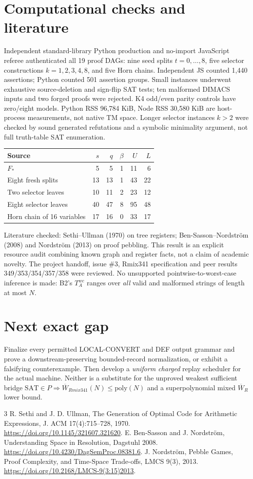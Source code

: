 \documentclass[11pt]{article}
\begin{document}
\section*{Computational checks and literature}
Independent standard-library Python production and no-import JavaScript referee authenticated all 19 proof DAGs: nine seed splits $t=0,\ldots,8$, five selector constructions $k=1,2,3,4,8$, and five Horn chains. Independent JS counted 1,440 assertions; Python counted 501 assertion groups. Small instances underwent exhaustive source-deletion and sign-flip SAT tests; ten malformed DIMACS inputs and two forged proofs were rejected. K4 odd/even parity controls have zero/eight models. Python RSS 96,784 KiB, Node RSS 30,580 KiB are host-process measurements, not native TM space. Longer selector instances $k>2$ were checked by sound generated refutations and a symbolic minimality argument, not full truth-table SAT enumeration.
\begin{center}
\begin{tabular}{lrrrrr}\toprule
Source & $s$ & $q$ & $\beta$ & $U$ & $L$\\\midrule
$F_*$ & 5&5&1&11&6\\
Eight fresh splits & 13&13&1&43&22\\
Two selector leaves & 10&11&2&23&12\\
Eight selector leaves & 40&47&8&95&48\\
Horn chain of 16 variables &17&16&0&33&17\\\bottomrule
\end{tabular}
\end{center}
Literature checked: Sethi--Ullman (1970) on tree registers; Ben-Sasson--Nordstr\"om (2008) and Nordstr\"om (2013) on proof pebbling. This result is an explicit resource audit combining known graph and register facts, not a claim of academic novelty. The project handoff, issue \#3, Rmix341 specification and peer results 349/353/354/357/358 were reviewed. No unsupported pointwise-to-worst-case inference is made: B2's $T_A^{wc}$ ranges over \emph{all} valid and malformed strings of length at most $N$.
\section*{Next exact gap}
Finalize every permitted LOCAL-CONVERT and DEF output grammar and prove a downstream-preserving bounded-record normalization, or exhibit a falsifying counterexample. Then develop a \emph{uniform charged} replay scheduler for the actual machine. Neither is a substitute for the unproved weakest sufficient bridge $\mathrm{SAT}\in P\Rightarrow \overline W_{Rmix341}(N)\le\mathrm{poly}(N)$ and a superpolynomial mixed $\overline W_R$ lower bound.
\begin{thebibliography}{3}
 R. Sethi and J. D. Ullman, The Generation of Optimal Code for Arithmetic Expressions, J. ACM 17(4):715--728, 1970. \url{https://doi.org/10.1145/321607.321620}.
 E. Ben-Sasson and J. Nordstr\"om, Understanding Space in Resolution, Dagstuhl 2008. \url{https://doi.org/10.4230/DagSemProc.08381.6}.
 J. Nordstr\"om, Pebble Games, Proof Complexity, and Time-Space Trade-offs, LMCS 9(3), 2013. \url{https://doi.org/10.2168/LMCS-9(3:15)2013}.
\end{thebibliography}
\end{document}
